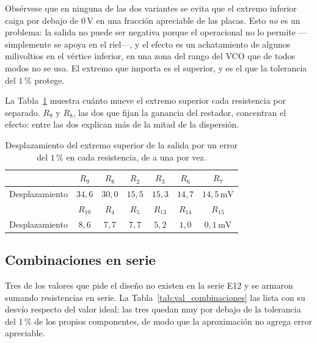 \documentclass[12pt, a4paper, twoside]{report}
\begin{document}
Obsérvese que en ninguna de las dos variantes se evita que el extremo
inferior caiga por debajo de $0\,\text{V}$ en una fracción apreciable de las
placas. Esto \emph{no} es un problema: la salida no puede ser negativa
porque el operacional no lo permite ---simplemente se apoya en el riel---, y
el efecto es un achatamiento de algunos milivoltios en el vértice inferior,
en una zona del rango del VCO que de todos modos no se usa. El extremo que
importa es el superior, y es el que la tolerancia del $1$\,\% protege.

La Tabla~\ref{tab:val_sensibilidad} muestra cuánto mueve el extremo superior
cada resistencia por separado. $R_9$ y $R_8$, las dos que fijan la ganancia
del restador, concentran el efecto: entre las dos explican más de la mitad
de la dispersión.

\begin{table}[H]
  \centering
  \caption{Desplazamiento del extremo superior de la salida por un error
  del $1$\,\% en cada resistencia, de a una por vez.}
  \label{tab:val_sensibilidad}
  \begin{tabular}{lcccccc}
    \toprule
    & $R_9$ & $R_8$ & $R_2$ & $R_3$ & $R_6$ & $R_7$ \\
    \midrule
    Desplazamiento & $34{,}6$ & $30{,}0$ & $15{,}5$ & $15{,}3$
      & $14{,}7$ & $14{,}5\,\text{mV}$ \\
    \midrule
    & $R_{10}$ & $R_4$ & $R_5$ & $R_{13}$ & $R_{14}$ & $R_{15}$ \\
    \midrule
    Desplazamiento & $8{,}6$ & $7{,}7$ & $7{,}7$ & $5{,}2$
      & $1{,}0$ & $0{,}1\,\text{mV}$ \\
    \bottomrule
  \end{tabular}
\end{table}

\subsection{Combinaciones en serie}
\label{sub:val_combinaciones}

Tres de los valores que pide el diseño no existen en la serie E12 y se
armaron sumando resistencias en serie. La Tabla~\ref{tab:val_combinaciones}
las lista con su desvío respecto del valor ideal; las tres quedan muy por
debajo de la tolerancia del $1$\,\% de los propios componentes, de modo que
la aproximación no agrega error apreciable.
\end{document}
